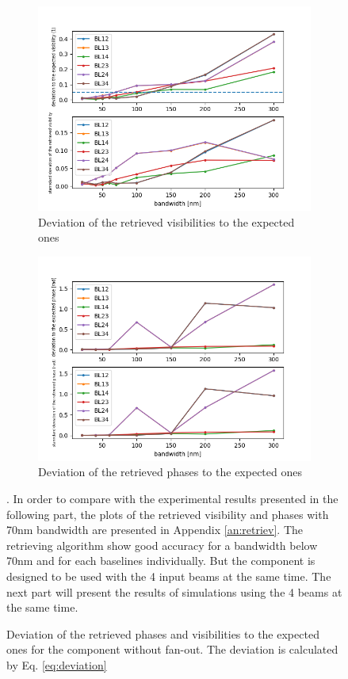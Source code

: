 \begin{figure}[htbp]
    \centering
    \begin{subfigure}{.45\textwidth}
        \includegraphics[scale=.45]{picture/retrieval_simu/visi_retrieved_nofan.png}
        \caption{Deviation of the retrieved visibilities to the expected ones}
    \end{subfigure}%
    \begin{subfigure}{.45\textwidth}
    \includegraphics[scale=.45]{picture/retrieval_simu/phase_retrieved_nofan.png}
    \caption{Deviation of the retrieved phases to the expected ones}
    \end{subfigure}
    \caption{Deviation of the retrieved phases and visibilities to the expected ones for the component without fan-out. The deviation is calculated by Eq. \ref{eq:deviation}}. In order to compare with the experimental results presented in the following part, the plots of the retrieved visibility and phases with 70nm bandwidth are presented in Appendix \ref{an:retriev}. The retrieving algorithm show good accuracy for a bandwidth below 70nm and for each baselines individually. But the component is designed to be used with the 4 input beams at the same time. The next part will present the results of simulations using the 4 beams at the same time.   
    \label{fig:retrieved_nofan}
\end{figure}

